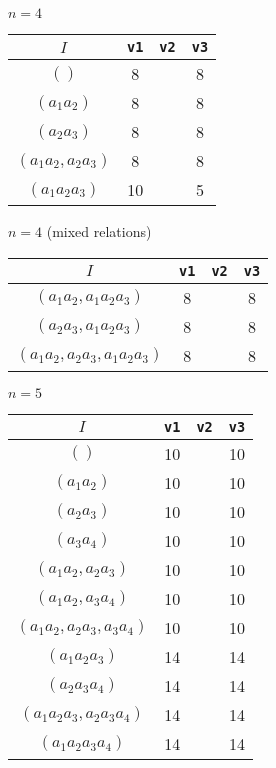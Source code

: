 \documentclass{article}
\begin{document}
\begin{flushleft}
\begin{center}
      $n=4$

      \begin{longtable}{|c|c|c|c|}
         \hline 
         $I$ & \texttt{v1} & \texttt{v2} & \texttt{v3} \\
         \hline 
         $()$ & 8 && 8 \\
         \hhline{|=|=|=|=|}
         $(a_1a_2)$ & 8 & & 8\\
         $(a_2a_3)$ & 8 && 8\\
         $(a_1a_2, a_2a_3)$ & 8 && 8\\
         \hhline{|=|=|=|=|}
         $(a_1a_2a_3)$ & 10 && 5\\
         \hline
      \end{longtable}

      $n=4$ (mixed relations)

      \begin{longtable}{|c|c|c|c|}
         \hline 
         $I$ & \texttt{v1} & \texttt{v2} & \texttt{v3} \\
         \hline
         $(a_1a_2, a_1a_2a_3)$ & 8 & & 8\\
         $(a_2a_3, a_1a_2a_3)$ & 8 & & 8\\
         $(a_1a_2, a_2a_3, a_1a_2a_3)$ & 8 & & 8\\
         \hline
      \end{longtable}

      $n=5$
      \begin{longtable}{|c|c|c|c|}
         \hline
         $I$ & \texttt{v1} & \texttt{v2} & \texttt{v3} \\
         \hline
         $()$ & 10 && 10 \\
         \hhline{|=|=|=|=|}
         $(a_1a_2)$ & 10 && 10\\
         $(a_2a_3)$ & 10 && 10 \\
         $(a_3a_4)$ & 10 && 10\\
         $(a_1a_2, a_2a_3)$ & 10 && 10 \\
         $(a_1a_2, a_3a_4)$ & 10 && 10 \\
         $(a_1a_2, a_2a_3, a_3a_4)$ & 10 && 10 \\
         \hhline{|=|=|=|=|}
         $(a_1a_2a_3)$ & 14 && 14\\
         $(a_2a_3a_4)$ & 14 && 14\\
         $(a_1a_2a_3, a_2a_3a_4)$ & 14 && 14\\
         \hhline{|=|=|=|=|}
         $(a_1a_2a_3a_4)$ & 14 && 14\\
         \hline
      \end{longtable}


\end{center}
\end{flushleft}
\end{document}
